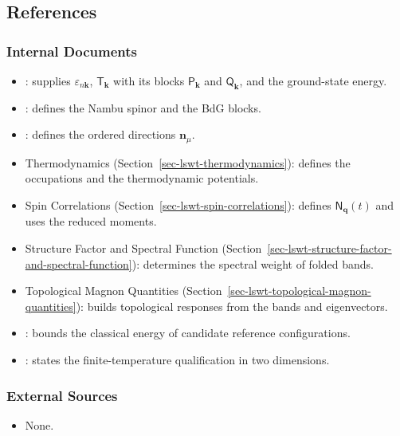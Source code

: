 \subsection{References}

\subsubsection{Internal Documents}

\begin{itemize}
\tightlist
\item
  : supplies \(\varepsilon_{n\mathbf k}\), \(\mathsf T_{\mathbf k}\) with its blocks \(\mathsf P_{\mathbf k}\) and \(\mathsf Q_{\mathbf k}\), and the ground-state energy.
\item
  : defines the Nambu spinor and the BdG blocks.
\item
  : defines the ordered directions \(\mathbf n_\mu\).
\item
  Thermodynamics (Section~\ref{sec-lswt-thermodynamics}): defines the occupations and the thermodynamic potentials.
\item
  Spin Correlations (Section~\ref{sec-lswt-spin-correlations}): defines \(\mathsf N_{\mathbf q}(t)\) and uses the reduced moments.
\item
  Structure Factor and Spectral Function (Section~\ref{sec-lswt-structure-factor-and-spectral-function}): determines the spectral weight of folded bands.
\item
  Topological Magnon Quantities (Section~\ref{sec-lswt-topological-magnon-quantities}): builds topological responses from the bands and eigenvectors.
\item
  : bounds the classical energy of candidate reference configurations.
\item
  : states the finite-temperature qualification in two dimensions.
\end{itemize}

\subsubsection{External Sources}

\begin{itemize}
\tightlist
\item
  None.
\end{itemize}
